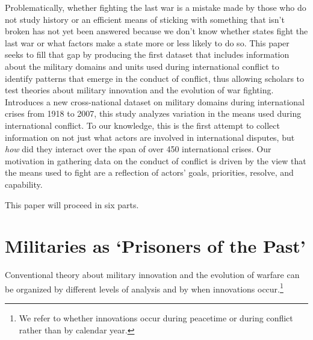 \documentclass[12pt,letterpaper]{article}
\begin{document}
	Problematically, whether fighting the last war is a mistake made by those who do not study history or an efficient means of sticking with something that isn't broken has not yet been answered because we don't know whether states fight the last war or what factors make a state more or less likely to do so. This paper seeks to fill that gap by producing the first dataset that includes information about the military domains and units used during international conflict to identify patterns that emerge in the conduct of conflict, thus allowing scholars to test theories about military innovation and the evolution of war fighting. Introduces a new cross-national dataset on military domains during international crises from 1918 to 2007, this study analyzes variation in the means used during international conflict. To our knowledge, this is the first attempt to collect information on not just what actors are involved in international disputes, but \textit{how} did they interact over the span of over 450 international crises. Our motivation in gathering data on the conduct of conflict is driven by the view that the means used to fight are a reflection of actors' goals, priorities, resolve, and capability.
	
	This paper will proceed in six parts.

\section{Militaries as `Prisoners of the Past'}
	Conventional theory about military innovation and the evolution of warfare can be organized by different levels of analysis and by when innovations occur.\footnote{We refer to whether innovations occur during peacetime or during conflict rather than by calendar year.}
	
\end{document}
